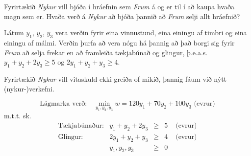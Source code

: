 \begin{daemi}\label{daemi:nykur}
Fyrirtækið \emph{Nykur} vill bjóða í hráefnin sem \emph{Frum}
á og er til í að kaupa hvaða magn sem er. Hvaða verð á
\emph{Nykur} að bjóða þannið að \emph{Frum} selji allt hráefnið?

Látum $y_1$, $y_2$, $y_3$ vera verðin fyrir eina
vinnustund, eina einingu af timbri og eina einingu af málmi.
Verðin þurfa að vera nógu há þannig að það borgi sig fyrir
\emph{Frum} að selja frekar en að framleiða tækjabúnað og glingur, þ.e.a.s.
$y_1+y_2+2y_3\ge 5 \mbox{ og } 2y_1+y_2+y_3\ge 4$.

Fyrirtækið \emph{Nykur} vill vitaskuld ekki greiða of mikið,
þannig fáum við nýtt (nykur-)verkefni.
\end{daemi}
\begin{lausn}
$$\textrm{Lágmarka verð:}\quad\min_{y_1,y_2,y_3} w = 120 y_1 + 70 y_2 + 100 y_3  \mbox{ (evrur)}  $$
m.t.t. sk.
\[ \begin{array}{lrclc}
\mbox{Tækjabúnaður:} & y_1 + y_2 + 2y_3 &\ge& 5 & \mbox{ (evrur)}\\
\mbox{Glingur:} & 2y_1 + y_2 + y_3 &\ge& 4 & \mbox{ (evrur)}\\
 & y_1, y_2, y_3 &\ge& 0 
   \end{array}
\]
 \end{lausn}
